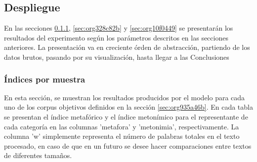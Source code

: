 \documentclass[12pt,letterpaper,twoside]{article}
\begin{document}
\subsection{Despliegue}
\label{sec:orgec4481b}
En las secciones \ref{sec:orgec46c67}, \ref{sec:org328c82b} y
\ref{sec:org10f0449} se presentarán los resultados del experimento
según los parámetros descritos en las secciones anteriores.
La presentación va en creciente órden de abstracción, partiendo
de los datos brutos, pasando por su visualización, hasta llegar
a las Conclusiones 

\subsubsection{Índices por muestra}
\label{sec:orgec46c67}
En esta sección, se muestran los resultados producidos por el modelo
para cada uno de los corpus objetivos definidos en la sección
\ref{sec:org935a46b}. En cada tabla se presentan el índice
metafórico y el índice metonímico para el representante de cada
categoría en las columnas 'metafora' y 'metonimia',
respectivamente. La columna 'w' simplemente representa el número de
palabras totales en el texto procesado, en caso de que en un futuro se
desee hacer comparaciones entre textos de diferentes tamaños.
\end{document}
